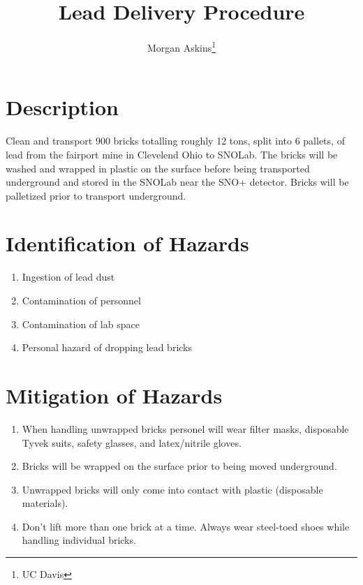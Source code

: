 \documentclass{article}
\title{Lead Delivery Procedure}
\author{Morgan Askins\thanks{UC Davis}}
\date{}
\begin{document}
\maketitle
\section*{Description}
Clean and transport 900 bricks totalling roughly 12 tons, split into 6 pallets, of lead from the fairport mine in Clevelend Ohio to SNOLab. The bricks will be washed and wrapped in plastic on the surface before being transported underground and stored in the SNOLab near the SNO+ detector. Bricks will be palletized prior to transport underground.
\section*{Identification of Hazards}
\begin{enumerate}
  \item Ingestion of lead dust
  \item Contamination of personnel
  \item Contamination of lab space
  \item Personal hazard of dropping lead bricks
\end{enumerate}
\section*{Mitigation of Hazards}
\begin{enumerate}
  \item When handling unwrapped bricks personel will wear filter masks, disposable Tyvek suits, safety glasses, and latex/nitrile gloves. 
  \item Bricks will be wrapped on the surface prior to being moved underground.
  \item Unwrapped bricks will only come into contact with plastic (disposable materials).
  \item Don't lift more than one brick at a time. Always wear steel-toed shoes while handling individual bricks.
\end{enumerate}
\newpage
\end{document}
